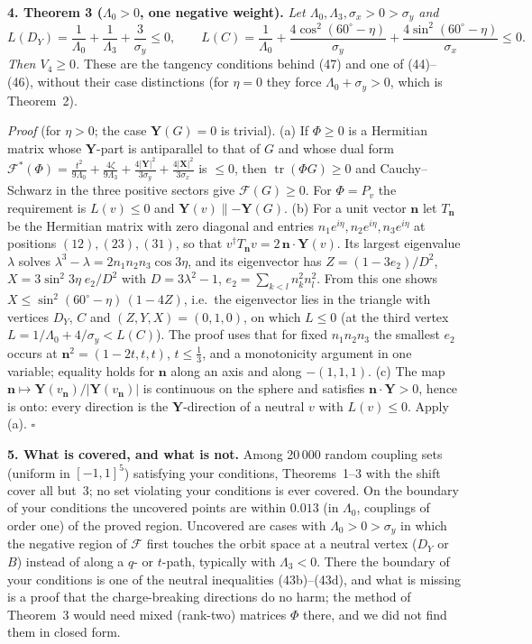 \documentclass[11pt,a4paper]{article}
\newcommand{\F}{\mathcal F}
\begin{document}
\textbf{4. Theorem 3 ($\Lambda_0>0$, one negative weight).} \emph{Let $\Lambda_0,\Lambda_3,\sigma_x>0>\sigma_y$ and}
\[
L(D_Y)=\frac1{\Lambda_0}+\frac1{\Lambda_3}+\frac3{\sigma_y}\le0,\qquad
L(C)=\frac1{\Lambda_0}+\frac{4\cos^2(60^\circ\!-\eta)}{\sigma_y}+\frac{4\sin^2(60^\circ\!-\eta)}{\sigma_x}\le0 .
\]
\emph{Then $V_4\ge0$.} These are the tangency conditions behind (47) and one of (44)--(46), without their case distinctions
(for $\eta=0$ they force $\Lambda_0+\sigma_y>0$, which is Theorem~2).

\emph{Proof} (for $\eta>0$; the case $\mathbf Y(G)=0$ is trivial). (a) If $\Phi\ge0$ is a Hermitian matrix whose $\mathbf Y$-part is antiparallel to that of $G$ and whose
dual form $\F^*(\Phi)=\tfrac{t^2}{9\Lambda_0}+\tfrac{4\zeta}{9\Lambda_3}+\tfrac{4|\mathbf Y|^2}{3\sigma_y}+\tfrac{4|\mathbf X|^2}{3\sigma_x}$
is $\le0$, then $\operatorname{tr}(\Phi G)\ge0$ and Cauchy--Schwarz in the three positive sectors give $\F(G)\ge0$. For
$\Phi=P_v$ the requirement is $L(v)\le0$ and $\mathbf Y(v)\parallel-\mathbf Y(G)$.
(b) For a unit vector $\mathbf n$ let $T_{\mathbf n}$ be the Hermitian matrix with zero diagonal and entries
$n_1e^{i\eta},n_2e^{i\eta},n_3e^{i\eta}$ at positions $(12),(23),(31)$, so that $v^\dagger T_{\mathbf n}v=2\,\mathbf n\!\cdot\!\mathbf Y(v)$.
Its largest eigenvalue $\lambda$ solves $\lambda^3-\lambda=2n_1n_2n_3\cos3\eta$, and its eigenvector has
$Z=(1-3e_2)/D^2$, $X=3\sin^2\!3\eta\;e_2/D^2$ with $D=3\lambda^2-1$, $e_2=\sum_{k<l}n_k^2n_l^2$. From this one shows
$X\le\sin^2(60^\circ\!-\eta)\,(1-4Z)$, i.e.\ the eigenvector lies in the triangle with vertices $D_Y$, $C$ and
$(Z,Y,X)=(0,1,0)$, on which $L\le0$ (at the third vertex $L=1/\Lambda_0+4/\sigma_y<L(C)$). The proof uses that for fixed
$n_1n_2n_3$ the smallest $e_2$ occurs at $\mathbf n^2=(1-2t,t,t)$, $t\le\tfrac13$, and a monotonicity argument in one
variable; equality holds for $\mathbf n$ along an axis and along $-(1,1,1)$.
(c) The map $\mathbf n\mapsto\mathbf Y(v_{\mathbf n})/|\mathbf Y(v_{\mathbf n})|$ is continuous on the sphere and satisfies
$\mathbf n\!\cdot\!\mathbf Y>0$, hence is onto: every direction is the $\mathbf Y$-direction of a neutral $v$ with
$L(v)\le0$. Apply (a). \hfill$\square$

\textbf{5. What is covered, and what is not.} Among 20\,000 random coupling sets (uniform in $[-1,1]^5$) satisfying
your conditions, Theorems~1--3 with the shift cover all but~3; no set violating your conditions is ever covered.
On the boundary of your conditions the uncovered points are within $0.013$ (in $\Lambda_0$, couplings of order one)
of the proved region. Uncovered are cases with $\Lambda_0>0>\sigma_y$ in which the negative region of $\F$ first
touches the orbit space at a neutral vertex ($D_Y$ or $B$) instead of along a $q$- or $t$-path, typically with
$\Lambda_3<0$. There the boundary of your conditions is one of the neutral inequalities (43b)--(43d), and what is
missing is a proof that the charge-breaking directions do no harm; the method of Theorem~3 would need mixed
(rank-two) matrices $\Phi$ there, and we did not find them in closed form.
\end{document}
